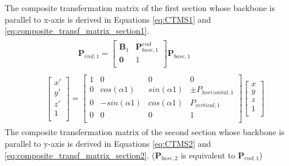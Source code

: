 The composite transfermation matrix of the first section whose backbone is parallel to x-axis is derived in Equations 
\ref{eq:CTMS1} and \ref{eq:composite_transf_matrix_section1}.
\begin{align}
    &\qquad\qquad
    \begin{aligned}
    \textbf{P}_{end,1}
    =
    \begin{bmatrix}
        \textbf{B}_1 & \textbf{P}_{base,1}^{end} \\
        \textbf{0} & 1 \\
    \end{bmatrix}
    \textbf{P}_{base,1}
    \end{aligned}\label{eq:CTMS1}\\
    &\begin{aligned}
    \begin{bmatrix}
        x' \\
        y' \\
        z' \\
        1  \\
    \end{bmatrix}
    =
    \begin{bmatrix}
        1 & 0 & 0 & 0 \\
        0 & cos(\alpha1) & sin(\alpha1) & \pm P_{horizontal,1} \\
        0 & -sin(\alpha1) & cos(\alpha1) & P_{vertical,1} \\
        0 & 0 & 0 & 1 \\
    \end{bmatrix}
    \begin{bmatrix}
        x \\
        y \\
        z \\
        1 \\
    \end{bmatrix}
    \end{aligned}
    \label{eq:composite_transf_matrix_section1}
\end{align}
The composite transfermation matrix of the second section whose backbone is parallel to y-axis is derived in Equations 
\ref{eq:CTMS2} and \ref{eq:composite_transf_matrix_section2}. ($\textbf{P}_{base,2}$ is equivalent to $\textbf{P}_{end,1}$)
